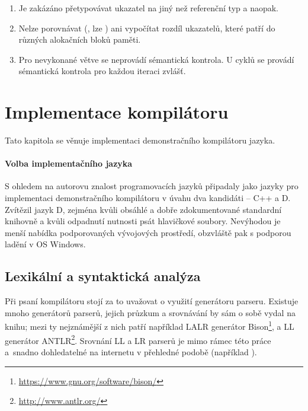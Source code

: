 \begin{enumerate}
	\item Je zakázáno přetypovávat \ctime ukazatel na jiný než referenční \ctime typ a naopak.
	\item Nelze porovnávat (\inlineCode{< > <= >=}, lze ) ani vypočítat rozdíl \ctime ukazatelů, které patří do různých alokačních bloků paměti.
	\item Pro nevykonané \ctime větve se neprovádí sémantická kontrola. U \ctime cyklů se provádí sémantická kontrola pro každou iteraci zvlášť.
\end{enumerate}

\chapter{Implementace kompilátoru}
Tato kapitola se věnuje implementaci demonstračního kompilátoru jazyka.

\subsubsection{Volba implementačního jazyka}
S ohledem na autorovu znalost programovacích jazyků připadaly jako jazyky pro implementaci demonstračního kompilátoru v úvahu dva kandidáti -- C++ a D. Zvítězil jazyk D, zejména kvůli obsáhlé a dobře zdokumentované standardní knihovně a kvůli odpadnutí nutnosti psát hlavičkové soubory. Nevýhodou je menší nabídka podporovaných vývojových prostředí, obzvláště pak s podporou ladění v OS Windows.

\section{Lexikální a syntaktická analýza}
Při psaní kompilátoru stojí za to uvažovat o využití generátoru parseru. Existuje mnoho generátorů parserů, jejich průzkum a srovnávání by sám o sobě vydal na knihu; mezi ty nejznámější z nich patří například LALR generátor Bison\footnote{\url{https://www.gnu.org/software/bison/}}, a LL generátor ANTLR\footnote{\url{http://www.antlr.org/}}. Srovnání LL a LR parserů je mimo rámec této práce a~snadno dohledatelné na internetu v přehledné podobě (například \cite{LLLRComp}).

